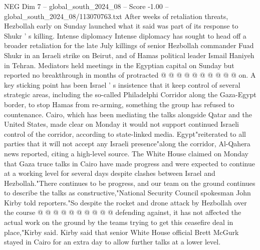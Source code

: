 \begin{textsample}{NEG Dim 7 – global\_south\_2024\_08 – Score -1.00 – global\_south\_2024\_08/113070763.txt}
After weeks of retaliation threats, Hezbollah early on Sunday launched what it said was part of its response to Shukr ' s killing.
Intense diplomacy Intense diplomacy has sought to head off a broader retaliation for the late July killings of senior Hezbollah commander Fuad Shukr in an Israeli strike on Beirut, and of Hamas political leader Ismail Haniyeh in Tehran.
Mediators held meetings in the Egyptian capital on Sunday but reported no breakthrough in months of protracted @ @ @ @ @ @ @ @ @ @ on.
A key sticking point has been Israel ' s insistence that it keep control of several strategic areas, including the so-called Philadelphi Corridor along the Gaza-Egypt border, to stop Hamas from re-arming, something the group has refused to countenance.
Cairo, which has been mediating the talks alongside Qatar and the United States, made clear on Monday it would not support continued Israeli control of the corridor, according to state-linked media.
Egypt"reiterated to all parties that it will not accept any Israeli presence"along the corridor, Al-Qahera news reported, citing a high-level source.
The White House claimed on Monday that Gaza truce talks in Cairo have made progress and were expected to continue at a working level for several days despite clashes between Israel and Hezbollah."There continues to be progress, and our team on the ground continues to describe the talks as constructive,"National Security Council spokesman John Kirby told reporters."So despite the rocket and drone attack by Hezbollah over the course @ @ @ @ @ @ @ @ @ @ defending against, it has not affected the actual work on the ground by the teams trying to get this ceasefire deal in place,"Kirby said.
Kirby said that senior White House official Brett McGurk stayed in Cairo for an extra day to allow further talks at a lower level.

\end{textsample}
